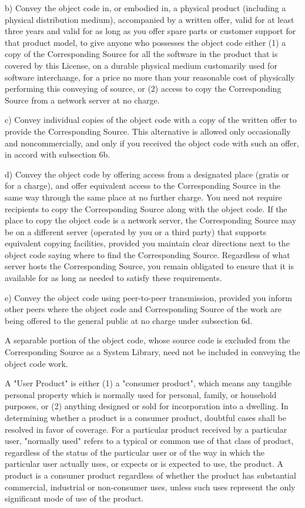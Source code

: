 \documentclass[11pt]{book}
\begin{document}
    b) Convey the object code in, or embodied in, a physical product
    (including a physical distribution medium), accompanied by a
    written offer, valid for at least three years and valid for as
    long as you offer spare parts or customer support for that product
    model, to give anyone who possesses the object code either (1) a
    copy of the Corresponding Source for all the software in the
    product that is covered by this License, on a durable physical
    medium customarily used for software interchange, for a price no
    more than your reasonable cost of physically performing this
    conveying of source, or (2) access to copy the
    Corresponding Source from a network server at no charge.

    c) Convey individual copies of the object code with a copy of the
    written offer to provide the Corresponding Source.  This
    alternative is allowed only occasionally and noncommercially, and
    only if you received the object code with such an offer, in accord
    with subsection 6b.

    d) Convey the object code by offering access from a designated
    place (gratis or for a charge), and offer equivalent access to the
    Corresponding Source in the same way through the same place at no
    further charge.  You need not require recipients to copy the
    Corresponding Source along with the object code.  If the place to
    copy the object code is a network server, the Corresponding Source
    may be on a different server (operated by you or a third party)
    that supports equivalent copying facilities, provided you maintain
    clear directions next to the object code saying where to find the
    Corresponding Source.  Regardless of what server hosts the
    Corresponding Source, you remain obligated to ensure that it is
    available for as long as needed to satisfy these requirements.

    e) Convey the object code using peer-to-peer transmission, provided
    you inform other peers where the object code and Corresponding
    Source of the work are being offered to the general public at no
    charge under subsection 6d.

    A separable portion of the object code, whose source code is excluded
    from the Corresponding Source as a System Library, need not be
    included in conveying the object code work.

    A "User Product" is either (1) a "consumer product", which means any
    tangible personal property which is normally used for personal, family,
    or household purposes, or (2) anything designed or sold for incorporation
    into a dwelling.  In determining whether a product is a consumer product,
    doubtful cases shall be resolved in favor of coverage.  For a particular
    product received by a particular user, "normally used" refers to a
    typical or common use of that class of product, regardless of the status
    of the particular user or of the way in which the particular user
    actually uses, or expects or is expected to use, the product.  A product
    is a consumer product regardless of whether the product has substantial
    commercial, industrial or non-consumer uses, unless such uses represent
    the only significant mode of use of the product.
\end{document}
